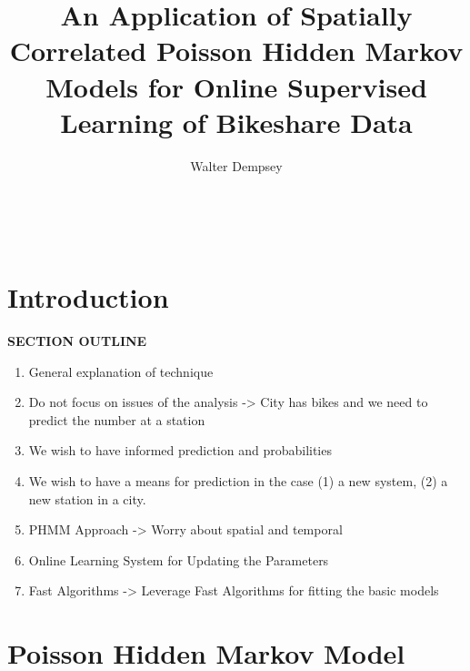 \documentclass{acm_proc_article-sp}
\begin{document}
\title{An Application of Spatially Correlated Poisson Hidden Markov Models for Online Supervised Learning of Bikeshare Data}

\author{
\alignauthor
Walter Dempsey\\
       \\
       \\
       \\
}

\maketitle

\begin{abstract}
\end{abstract}



\section{Introduction}

\vspace{0.25cm}
{\bf SECTION OUTLINE}
\begin{enumerate}
\item General explanation of technique
\item Do not focus on issues of the analysis -> City has bikes and we need to predict the number at a station
\item We wish to have informed prediction and probabilities
\item We wish to have a means for prediction in the case (1) a new system, (2) a new station in a city.
\item PHMM Approach -> Worry about spatial and temporal
\item Online Learning System for Updating the Parameters
\item Fast Algorithms -> Leverage Fast Algorithms for fitting the basic models
\end{enumerate}
\vspace{0.5cm}


\section{Poisson Hidden Markov Model}
\end{document}
